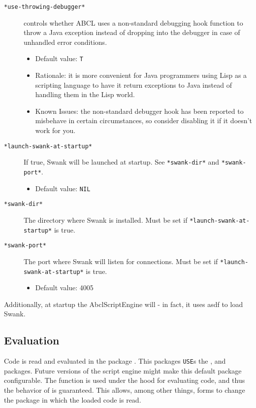 \documentclass[10pt]{book}
\begin{document}
\begin{description}
\item[\texttt{*use-throwing-debugger*}] controls whether ABCL uses a
  non-standard debugging hook function to throw a Java exception
  instead of dropping into the debugger in case of unhandled error
  conditions.
  \begin{itemize}
  \item Default value: \texttt{T}
  \item Rationale: it is more convenient for Java programmers using
    Lisp as a scripting language to have it return exceptions to Java
    instead of handling them in the Lisp world.
  \item Known Issues: the non-standard debugger hook has been reported
    to misbehave in certain circumstances, so consider disabling it if
    it doesn't work for you.
  \end{itemize}
\item[\texttt{*launch-swank-at-startup*}] If true, Swank will be launched at
  startup. See \texttt{*swank-dir*} and \texttt{*swank-port*}.
  \begin{itemize}
  \item Default value: \texttt{NIL}
  \end{itemize}
\item[\texttt{*swank-dir*}] The directory where Swank is installed. Must be set
  if \texttt{*launch-swank-at-startup*} is true.
\item[\texttt{*swank-port*}] The port where Swank will listen for
  connections. Must be set if \texttt{*launch-swank-at-startup*} is
  true.
  \begin{itemize}
  \item Default value: 4005
  \end{itemize}
\end{description}

Additionally, at startup the AbclScriptEngine will  - in fact, it uses asdf to load Swank.

\subsection{Evaluation}

Code is read and evaluated in the package . This
packages \texttt{USE}s the ,  and
 packages. Future versions of the script engine might
make this default package configurable. The  function is
used under the hood for evaluating code, and thus the behavior of
 is guaranteed. This allows, among other things,
 forms to change the package in which the loaded code
is read.
\end{document}
